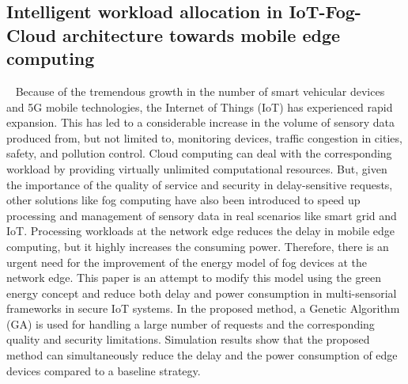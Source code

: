 \subsection{Intelligent workload allocation in IoT-Fog-Cloud architecture towards mobile edge computing}~\cite{abbasi2021intelligent}
Because of the tremendous growth in the number of smart vehicular devices and 5G mobile technologies, the
Internet of Things (IoT) has experienced rapid expansion. This has led to a considerable increase in the volume
of sensory data produced from, but not limited to, monitoring devices, traffic congestion in cities, safety, and
pollution control. Cloud computing can deal with the corresponding workload by providing virtually unlimited
computational resources. But, given the importance of the quality of service and security in delay-sensitive
requests, other solutions like fog computing have also been introduced to speed up processing and management
of sensory data in real scenarios like smart grid and IoT. Processing workloads at the network edge reduces
the delay in mobile edge computing, but it highly increases the consuming power. Therefore, there is an
urgent need for the improvement of the energy model of fog devices at the network edge. This paper is an
attempt to modify this model using the green energy concept and reduce both delay and power consumption in
multi-sensorial frameworks in secure IoT systems. In the proposed method, a Genetic Algorithm (GA) is used
for handling a large number of requests and the corresponding quality and security limitations. Simulation
results show that the proposed method can simultaneously reduce the delay and the power consumption of
edge devices compared to a baseline strategy.\\

